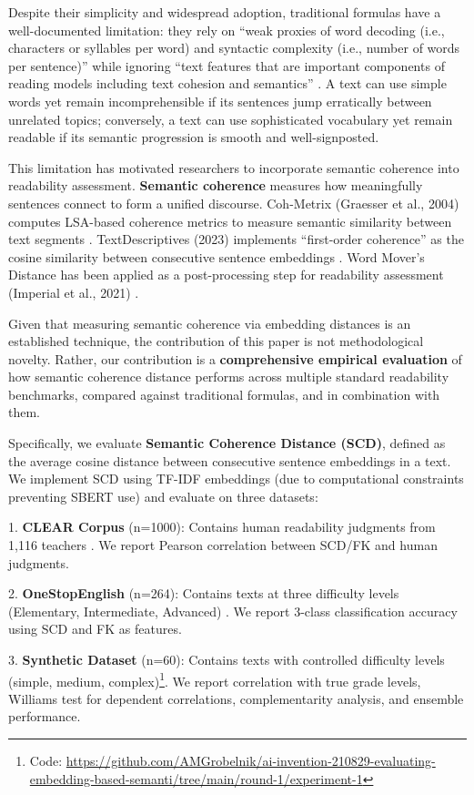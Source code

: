 \documentclass[11pt,letterpaper]{article}
\begin{document}
Despite their simplicity and widespread adoption, traditional formulas have a well-documented limitation: they rely on ``weak proxies of word decoding (i.e., characters or syllables per word) and syntactic complexity (i.e., number of words per sentence)'' while ignoring ``text features that are important components of reading models including text cohesion and semantics'' \cite{Crossley2021}. A text can use simple words yet remain incomprehensible if its sentences jump erratically between unrelated topics; conversely, a text can use sophisticated vocabulary yet remain readable if its semantic progression is smooth and well-signposted.

This limitation has motivated researchers to incorporate semantic coherence into readability assessment. \textbf{Semantic coherence} measures how meaningfully sentences connect to form a unified discourse. Coh-Metrix (Graesser et al., 2004) computes LSA-based coherence metrics to measure semantic similarity between text segments \cite{Graesser2011}. TextDescriptives (2023) implements ``first-order coherence'' as the cosine similarity between consecutive sentence embeddings \cite{Hlasse2023}. Word Mover's Distance has been applied as a post-processing step for readability assessment (Imperial et al., 2021) \cite{Imperial2021WMD}.

Given that measuring semantic coherence via embedding distances is an established technique, the contribution of this paper is not methodological novelty. Rather, our contribution is a \textbf{comprehensive empirical evaluation} of how semantic coherence distance performs across multiple standard readability benchmarks, compared against traditional formulas, and in combination with them.

Specifically, we evaluate \textbf{Semantic Coherence Distance (SCD)}, defined as the average cosine distance between consecutive sentence embeddings in a text. We implement SCD using TF-IDF embeddings (due to computational constraints preventing SBERT use) and evaluate on three datasets:

1. \textbf{CLEAR Corpus} (n=1000): Contains human readability judgments from 1,116 teachers \cite{Crossley2021}. We report Pearson correlation between SCD/FK and human judgments.

2. \textbf{OneStopEnglish} (n=264): Contains texts at three difficulty levels (Elementary, Intermediate, Advanced) \cite{Vajjala2018}. We report 3-class classification accuracy using SCD and FK as features.

3. \textbf{Synthetic Dataset} (n=60): Contains texts with controlled difficulty levels (simple, medium, complex)\footnote{Code: \url{https://github.com/AMGrobelnik/ai-invention-210829-evaluating-embedding-based-semanti/tree/main/round-1/experiment-1}}. We report correlation with true grade levels, Williams test for dependent correlations, complementarity analysis, and ensemble performance.
\end{document}
